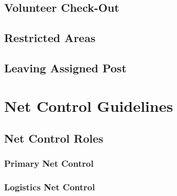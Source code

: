 \documentclass[pdflatex,letterpaper,twoside,12pt]{book}
\begin{document}
\section{Volunteer Check-Out}


\section{Restricted Areas}


\section{Leaving Assigned Post}


\chapter{Net Control Guidelines}


\section{Net Control Roles}

\subsection{Primary Net Control}

\iffalse %
Describe role, types of traffic, etc
\fi

\subsection{Logistics Net Control}
\end{document}

